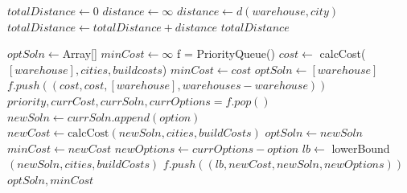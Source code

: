 \documentclass{article}
\begin{document}
\begin{algorithm}
\begin{algorithmic}[1]
	\State $totalDistance \gets 0$
		\State $distance \gets \infty$
				\State $distance \gets d(warehouse, city)$
			\EndIf
		\EndFor
		\State $totalDistance \gets totalDistance + distance$
	\EndFor
	\State \Return $totalDistance$
\EndFunction
\end{algorithmic}
\end{algorithm}

\begin{algorithm}
\begin{algorithmic}[1]
	\State $optSoln \gets $Array[]
	\State $minCost \gets \infty$
	\State f = PriorityQueue()
		\State $cost \gets$ calcCost($[warehouse], cities, buildcosts$)
			\State $minCost \gets cost$
			\State $optSoln \gets [warehouse]$
		\EndIf
		\State $f.push((cost, cost, [warehouse], warehouses - warehouse))$
	\EndFor
		\State $priority, currCost, currSoln, currOptions = f.pop()$
			\State $newSoln \gets currSoln.append(option)$
			\State $newCost \gets \text{calcCost}(newSoln, cities, buildCosts)$
				\State $optSoln \gets newSoln$
				\State $minCost \gets newCost$
			\Else
				\State $newOptions \gets currOptions - option$
				\State $lb \gets $ lowerBound$(newSoln, cities, buildCosts)$
					\State $f.push((lb, newCost, newSoln, newOptions))$
				\EndIf
			\EndIf
		\EndFor
	\EndWhile
	\State \Return $optSoln, minCost$
\EndFunction
\end{algorithmic}
\end{algorithm}

\subsection{}
\end{document}
